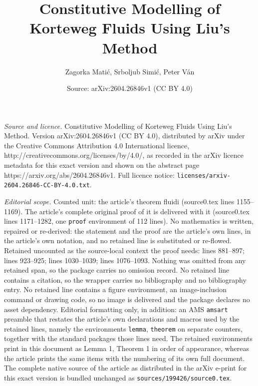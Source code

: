 \documentclass[10pt,a4paper]{amsart}
\title{Constitutive Modelling of Korteweg Fluids Using Liu's Method}
\author{Zagorka Mati\'c, Srboljub Simi\'c, Peter V\'an}
\date{Source: arXiv:2604.26846v1 (CC BY 4.0)}
\begin{document}
\maketitle

\noindent\emph{Source and licence.} Constitutive Modelling of Korteweg Fluids Using Liu's Method. Version arXiv:2604.26846v1 (CC BY 4.0), distributed by arXiv under the Creative Commons Attribution 4.0 International licence, http://creativecommons.org/licenses/by/4.0/, as recorded in the arXiv licence metadata for this exact version and shown on the abstract page https://arxiv.org/abs/2604.26846v1. Full licence notice: \texttt{licenses/arxiv-2604.26846-CC-BY-4.0.txt}.\par\smallskip

\noindent\textit{Editorial scope.} Counted unit: the article's theorem fluidi (source0.tex lines 1155--1169). The article's complete original proof of it is delivered with it (source0.tex lines 1171--1282, one \texttt{proof} environment of 112 lines). No mathematics is written, repaired or re-derived: the statement and the proof are the article's own lines, in the article's own notation, and no retained line is substituted or re-flowed.  Retained uncounted as the source-local context the proof needs: lines 881--897; lines 923--925; lines 1030--1039; lines 1076--1093.  Nothing was omitted from any retained span, so the package carries no omission record.  No retained line contains a citation, so the wrapper carries no bibliography and no bibliography entry.  No retained line contains a figure environment, an image-inclusion command or drawing code, so no image is delivered and the package declares no asset dependency.  Editorial formatting only, in addition: an AMS \texttt{amsart} preamble that restates the article's own declarations and macros used by the retained lines, namely the environments \texttt{lemma}, \texttt{theorem} on separate counters, together with the standard packages those lines need.  The retained environments print in this document as Lemma 1, Theorem 1 in order of appearance, whereas the article prints the same items with the numbering of its own full document.  The complete native source of the article as distributed in the arXiv e-print for this exact version is bundled unchanged as \texttt{sources/199426/source0.tex}.
\end{document}
